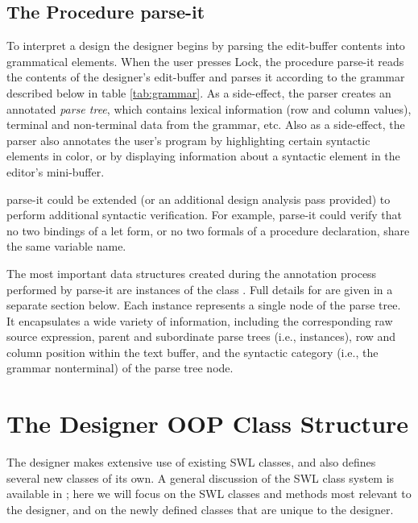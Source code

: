 \documentclass{article}
\begin{document}
\subsection{The Procedure {\sf parse-it}}

To interpret a design the designer begins by parsing the edit-buffer
contents into grammatical elements. When the user presses Lock, the
procedure {\sf parse-it} reads the contents of the designer's
edit-buffer and parses it according to the grammar described below in
table \ref{tab:grammar}.  As a side-effect, the parser creates an
annotated {\em parse tree}, which contains lexical information (row
and column values), terminal and non-terminal data from the grammar,
etc.  Also as a side-effect, the parser also annotates the user's
program by highlighting certain syntactic elements in color, or by
displaying information about a syntactic element in the editor's
mini-buffer.

{\sf parse-it} could be extended (or an additional design analysis
pass provided) to perform additional syntactic verification. For
example, {\sf parse-it} could verify that no two bindings of a {\sf let}
form, or no two formals of a procedure declaration, share the same
variable name.

The most important data structures created during the annotation
process performed by {\sf parse-it} are instances of the class
.  Full details for  are
given in a separate section below.  Each 
instance represents a single node of the parse tree.  It encapsulates
a wide variety of information, including the corresponding raw source
expression, parent and subordinate parse trees (i.e.,
 instances), row and column position within the
text buffer, and the syntactic category (i.e.,
the grammar nonterminal) of the parse tree node.




\section{The Designer OOP Class Structure}

The designer makes extensive use of existing {\sc SWL} classes, and also
defines several new classes of its own.  A general discussion of the
{\sc SWL} class system is available in \cite{SWL}; here we will focus on the
{\sc SWL} classes and methods most relevant to the designer, and on the
newly defined classes that are unique to the designer.
\end{document}
